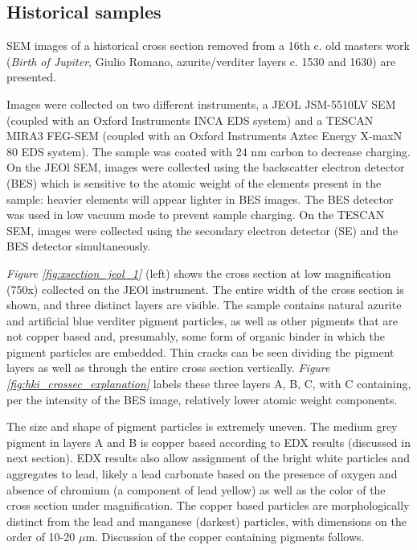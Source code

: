\subsection[Historical samples]{Historical samples}
\label{subsection3.1.3}

SEM images of a historical cross section removed from a 16th c. old masters work (\textit{Birth of Jupiter}, Giulio Romano, azurite/verditer layers c. 1530 and 1630) are presented.

Images were collected on two different instruments, a JEOL JSM-5510LV SEM (coupled with an Oxford Instruments INCA EDS system) and a TESCAN MIRA3 FEG-SEM (coupled with an Oxford Instruments Aztec Energy X-maxN 80 EDS system). The sample was coated with 24 nm carbon to decrease charging. On the JEOl SEM, images were collected using the backscatter electron detector (BES) which is sensitive to the atomic weight of the elements present in the sample: heavier elements will appear lighter in BES images. The BES detector was used in low vacuum mode to prevent sample charging. On the TESCAN SEM, images were collected using the secondary electron detector (SE) and the BES detector simultaneously. 

\textit{Figure \ref{fig:xsection_jeol_1}} (left) shows the cross section at low magnification (750x) collected on the JEOl instrument. The entire width of the cross section is shown, and three distinct layers are visible. The sample contains natural azurite and artificial blue verditer pigment particles, as well as other pigments that are not copper based and, presumably, some form of organic binder in which the pigment particles are embedded. Thin cracks can be seen dividing the pigment layers as well as through the entire cross section vertically. \textit{Figure \ref{fig:hki_crossec_explanation}} labels these three layers A, B, C, with C containing, per the intensity of the BES image, relatively lower atomic weight components. 

The size and shape of pigment particles is extremely uneven. The medium grey pigment in layers A and B is copper based according to EDX results (discussed in next section). EDX results also allow assignment of the bright white particles and aggregates to lead, likely a lead carbonate based on the presence of oxygen and absence of chromium (a component of lead yellow) as well as the color of the cross section under magnification. The copper based particles are morphologically distinct from the lead and manganese (darkest) particles, with dimensions on the order of 10-20 $\mu$m. Discussion of the copper containing pigments follows.

